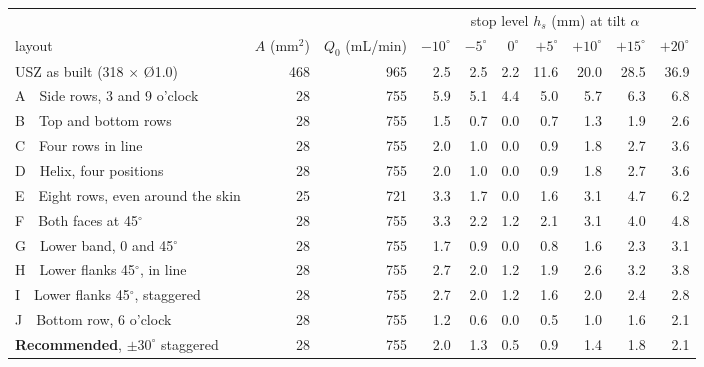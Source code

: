 \begin{tabular}{@{}l r r rrrrrrr@{}}
\toprule
 & & & \multicolumn{7}{c}{stop level $h_s$ (mm) at tilt $\alpha$} \\
\cmidrule(l){4-10}
layout & $A$ (mm$^2$) & $Q_0$ (mL/min) & $-10^\circ$ & $-5^\circ$ & $0^\circ$ & $+5^\circ$ & $+10^\circ$ & $+15^\circ$ & $+20^\circ$ \\
\midrule
USZ as built (318 $\times$ \O1.0) & 468 & 965 & 2.5 & 2.5 & 2.2 & 11.6 & 20.0 & 28.5 & 36.9 \\
A\ \ Side rows, 3 and 9 o'clock & 28 & 755 & 5.9 & 5.1 & 4.4 & 5.0 & 5.7 & 6.3 & 6.8 \\
B\ \ Top and bottom rows & 28 & 755 & 1.5 & 0.7 & 0.0 & 0.7 & 1.3 & 1.9 & 2.6 \\
C\ \ Four rows in line & 28 & 755 & 2.0 & 1.0 & 0.0 & 0.9 & 1.8 & 2.7 & 3.6 \\
D\ \ Helix, four positions & 28 & 755 & 2.0 & 1.0 & 0.0 & 0.9 & 1.8 & 2.7 & 3.6 \\
E\ \ Eight rows, even around the skin & 25 & 721 & 3.3 & 1.7 & 0.0 & 1.6 & 3.1 & 4.7 & 6.2 \\
F\ \ Both faces at 45$^\circ$ & 28 & 755 & 3.3 & 2.2 & 1.2 & 2.1 & 3.1 & 4.0 & 4.8 \\
G\ \ Lower band, 0 and 45$^\circ$ & 28 & 755 & 1.7 & 0.9 & 0.0 & 0.8 & 1.6 & 2.3 & 3.1 \\
H\ \ Lower flanks 45$^\circ$, in line & 28 & 755 & 2.7 & 2.0 & 1.2 & 1.9 & 2.6 & 3.2 & 3.8 \\
I\ \ Lower flanks 45$^\circ$, staggered & 28 & 755 & 2.7 & 2.0 & 1.2 & 1.6 & 2.0 & 2.4 & 2.8 \\
J\ \ Bottom row, 6 o'clock & 28 & 755 & 1.2 & 0.6 & 0.0 & 0.5 & 1.0 & 1.6 & 2.1 \\
\midrule
\textbf{Recommended}, $\pm30^\circ$ staggered & 28 & 755 & 2.0 & 1.3 & 0.5 & 0.9 & 1.4 & 1.8 & 2.1 \\
\bottomrule
\end{tabular}
